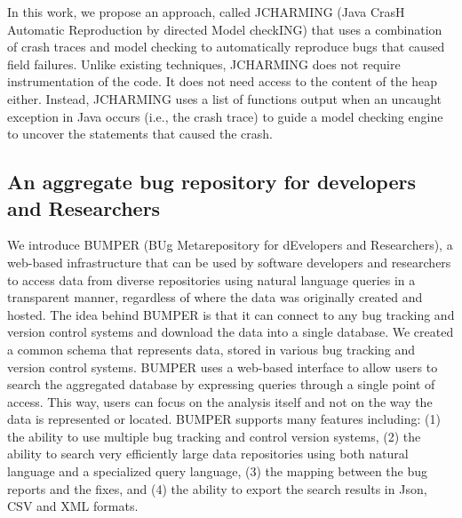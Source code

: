 In this work, we propose an approach, called JCHARMING (Java CrasH Automatic Reproduction by directed Model checkING) that uses a combination of crash traces and model checking to automatically reproduce bugs that caused field failures.
Unlike existing techniques, JCHARMING does not require instrumentation of the code.
It does not need access to the content of the heap either.
Instead, JCHARMING uses a list of functions output when an uncaught exception in Java occurs (i.e., the crash trace) to guide a model checking engine to uncover the statements that caused the crash.

\subsection{An aggregate bug  repository for  developers  and  Researchers}
We introduce BUMPER (BUg Metarepository for  dEvelopers  and  Researchers),  a  web-based  infrastructure
that  can  be  used  by  software  developers  and  researchers  to access  data  from  diverse  repositories  using  natural  language queries in a transparent manner, regardless of where the data was originally created and hosted.
The  idea  behind  BUMPER  is  that  it  can  connect  to  any bug  tracking  and  version  control  systems  and  download  the data  into  a  single  database.
We  created  a  common  schema that represents data, stored in various bug tracking and version control systems.
BUMPER uses a web-based interface to allow users to search the aggregated database by expressing queries through a single point of access.
This way, users can focus on the analysis itself and not on the way the data is represented or located.
BUMPER supports many features including: (1) the ability to use multiple bug tracking and control version systems, (2) the  ability  to  search  very  efficiently  large  data  repositories using both natural language and a specialized query language, (3)  the  mapping  between  the  bug  reports  and  the  fixes,  and (4)  the  ability  to  export  the  search  results  in  Json,  CSV  and XML formats.

